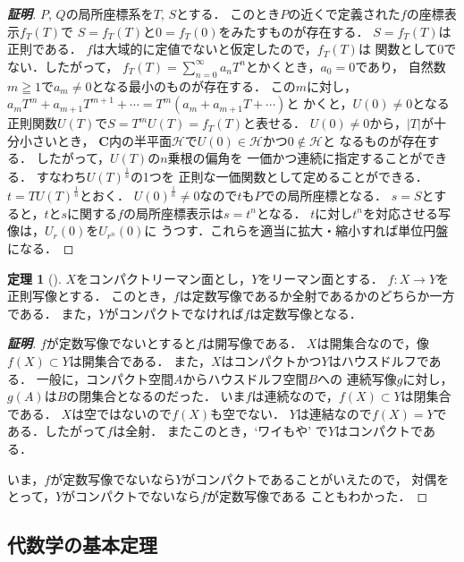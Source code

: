 \documentclass[11pt, a4paper, dvipdfmx, draft]{jsarticle}
\theoremstyle{definition}
\newtheorem{Theorem}[Axiom]{定理}
\newcommand{\cc}{\mathbf{C}}
\theoremstyle{mystyle}
\numberwithin{equation}{section} %
\begin{document}
\begin{proof}[\bf{証明}]
    $P$, $Q$の局所座標系を$T$, $S$とする．
    このとき$P$の近くで定義された$f$の座標表示$f_T(T)$で
    $S=f_T(T)$と$0=f_T(0)$をみたすものが存在する．
    $S=f_T(T)$は正則である．
    $f$は大域的に定値でないと仮定したので，$f_T(T)$は
    関数として$0$でない．したがって，
    $f_T(T)=\sum_{n=0}^{\infty}a_nT^n$とかくとき，$a_0=0$であり，
    自然数$m\geqq1$で$a_m\neq0$となる最小のものが存在する．
    この$m$に対し，
    $a_mT^m+a_{m+1}T^{m+1}+\cdots=T^m(a_m+a_{m+1}T+\cdots)$と
    かくと，$U(0)\neq0$となる
    正則関数$U(T)$で$S=T^mU(T)=f_T(T)$と表せる．
    $U(0)\neq0$から，$|T|$が十分小さいとき，
    \newcommand{\hpln}{\mathcal{H}}
    $\cc$内の半平面$\hpln$で$U(0)\in\hpln$かつ$0\not\in\hpln$と
    なるものが存在する．
    したがって，$U(T)$の$n$乗根の偏角を
    一価かつ連続に指定することができる．
    すなわち$U(T)^{\frac{1}{n}}$の1つを
    正則な一価関数として定めることができる．
    $t=TU(T)^{\frac{1}{n}}$とおく．
    $U(0)^{\frac{1}{n}}\neq0$なので$t$も$P$での局所座標となる．
    $s=S$とすると，$t$と$s$に関する$f$の局所座標表示は$s=t^n$となる．
    $t$に対し$t^n$を対応させる写像は，$U_r(0)$を$U_{r^n}(0)$に
    うつす．これらを適当に拡大・縮小すれば単位円盤になる．
\end{proof}

\begin{Theorem}[{\cite[定理2.22]{ogs}}]
    $X$をコンパクトリーマン面とし，$Y$をリーマン面とする．
    $f\colon X\to Y$を正則写像とする．
    このとき，$f$は定数写像であるか全射であるかのどちらか一方である．
    また，$Y$がコンパクトでなければ$f$は定数写像となる．
\end{Theorem}

\begin{proof}[\bf{証明}]
    $f$が定数写像でないとすると$f$は開写像である．
    $X$は開集合なので，像$f(X)\subset Y$は開集合である．
    また，$X$はコンパクトかつ$Y$はハウスドルフである．
    一般に，コンパクト空間$A$からハウスドルフ空間$B$への
    連続写像$g$に対し，$g(A)$は$B$の閉集合となるのだった．
    いま$f$は連続なので，$f(X)\subset Y$は閉集合である．
    $X$は空ではないので$f(X)$も空でない．
    $Y$は連結なので$f(X)=Y$である．したがって$f$は全射．
    またこのとき，`ワイもや' で$Y$はコンパクトである．

    いま，$f$が定数写像でないなら$Y$がコンパクトであることがいえたので，
    対偶をとって，$Y$がコンパクトでないなら$f$が定数写像である
    こともわかった．
\end{proof}

\subsection{代数学の基本定理}
\end{document}
